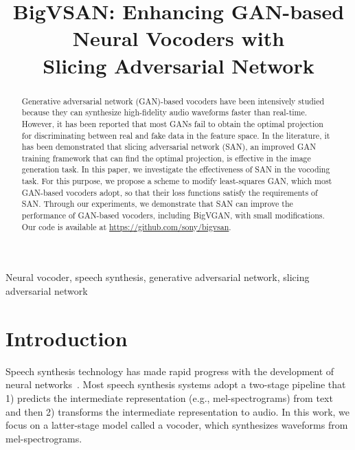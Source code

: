 \documentclass{article}
\title{BigVSAN: Enhancing GAN-based Neural Vocoders with \\ Slicing Adversarial Network}
\begin{document}
\ninept
\maketitle
\begin{abstract}
Generative adversarial network (GAN)-based vocoders have been intensively studied because they can synthesize high-fidelity audio waveforms faster than real-time. However, it has been reported that most GANs fail to obtain the optimal projection for discriminating between real and fake data in the feature space. In the literature, it has been demonstrated that slicing adversarial network (SAN), an improved GAN training framework that can find the optimal projection, is effective in the image generation task. In this paper, we investigate the effectiveness of SAN in the vocoding task. For this purpose, we propose a scheme to modify least-squares GAN, which most GAN-based vocoders adopt, so that their loss functions satisfy the requirements of SAN. Through our experiments, we demonstrate that SAN can improve the performance of GAN-based vocoders, including BigVGAN, with small modifications. Our code is available at \url{https://github.com/sony/bigvsan}.

\end{abstract}
\begin{keywords}
Neural vocoder, speech synthesis, generative adversarial network, slicing adversarial network
\end{keywords}
\section{Introduction}
\label{sec:intro}

Speech synthesis technology has made rapid progress with the development of neural networks~\cite{shen2018natural,ren2021fastspeech}. Most speech synthesis systems adopt a two-stage pipeline that 1) predicts the intermediate representation (e.g., mel-spectrograms) from text and then 2) transforms the intermediate representation to audio. In this work, we focus on a latter-stage model called a vocoder, which synthesizes waveforms from mel-spectrograms.
\end{document}
